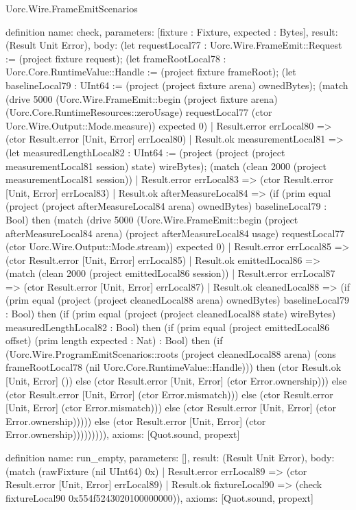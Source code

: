 \begin{lexlean}{Uorc.Wire.FrameEmitScenarios}
\begin{semanticmodule}
definition{
  name: check,
  parameters: [fixture : Fixture, expected : Bytes],
  result: (Result Unit Error),
  body: (let requestLocal77 : Uorc.Wire.FrameEmit::Request := (project fixture request); (let frameRootLocal78 : Uorc.Core.RuntimeValue::Handle := (project fixture frameRoot); (let baselineLocal79 : UInt64 := (project (project fixture arena) ownedBytes); (match (drive 5000 (Uorc.Wire.FrameEmit::begin (project fixture arena) (Uorc.Core.RuntimeResources::zeroUsage) requestLocal77 (ctor Uorc.Wire.Output::Mode.measure)) expected 0)
    | Result.error errLocal80 => (ctor Result.error [Unit, Error] errLocal80)
    | Result.ok measurementLocal81 => (let measuredLengthLocal82 : UInt64 := (project (project (project measurementLocal81 session) state) wireBytes); (match (clean 2000 (project measurementLocal81 session))
      | Result.error errLocal83 => (ctor Result.error [Unit, Error] errLocal83)
      | Result.ok afterMeasureLocal84 => (if (prim equal (project (project afterMeasureLocal84 arena) ownedBytes) baselineLocal79 : Bool) then (match (drive 5000 (Uorc.Wire.FrameEmit::begin (project afterMeasureLocal84 arena) (project afterMeasureLocal84 usage) requestLocal77 (ctor Uorc.Wire.Output::Mode.stream)) expected 0)
        | Result.error errLocal85 => (ctor Result.error [Unit, Error] errLocal85)
        | Result.ok emittedLocal86 => (match (clean 2000 (project emittedLocal86 session))
          | Result.error errLocal87 => (ctor Result.error [Unit, Error] errLocal87)
          | Result.ok cleanedLocal88 => (if (prim equal (project (project cleanedLocal88 arena) ownedBytes) baselineLocal79 : Bool) then (if (prim equal (project (project cleanedLocal88 state) wireBytes) measuredLengthLocal82 : Bool) then (if (prim equal (project emittedLocal86 offset) (prim length expected : Nat) : Bool) then (if (Uorc.Wire.ProgramEmitScenarios::roots (project cleanedLocal88 arena) (cons frameRootLocal78 (nil Uorc.Core.RuntimeValue::Handle))) then (ctor Result.ok [Unit, Error] ()) else (ctor Result.error [Unit, Error] (ctor Error.ownership))) else (ctor Result.error [Unit, Error] (ctor Error.mismatch))) else (ctor Result.error [Unit, Error] (ctor Error.mismatch))) else (ctor Result.error [Unit, Error] (ctor Error.ownership))))) else (ctor Result.error [Unit, Error] (ctor Error.ownership))))))))),
  axioms: [Quot.sound, propext]
}

definition{
  name: run_empty,
  parameters: [],
  result: (Result Unit Error),
  body: (match (rawFixture (nil UInt64) 0x)
    | Result.error errLocal89 => (ctor Result.error [Unit, Error] errLocal89)
    | Result.ok fixtureLocal90 => (check fixtureLocal90 0x554f5243020100000000)),
  axioms: [Quot.sound, propext]
}


\end{semanticmodule}
\end{lexlean}
